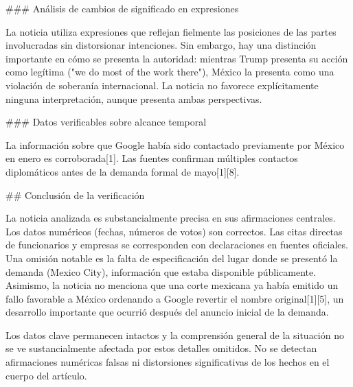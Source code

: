 \documentclass[10pt,a4paper]{article}
\begin{document}
\par\medskip
\#\#\# An\'{a}lisis de cambios de significado en expresiones
\par\medskip
La noticia utiliza expresiones que reflejan fielmente las posiciones de las partes involucradas sin distorsionar intenciones. Sin embargo, hay una distinci\'{o}n importante en c\'{o}mo se presenta la autoridad: mientras Trump presenta su acci\'{o}n como leg\'{i}tima ("we do most of the work there"), M\'{e}xico la presenta como una violaci\'{o}n de soberan\'{i}a internacional. La noticia no favorece expl\'{i}citamente ninguna interpretaci\'{o}n, aunque presenta ambas perspectivas.
\par\medskip
\#\#\# Datos verificables sobre alcance temporal
\par\medskip
La informaci\'{o}n sobre que Google hab\'{i}a sido contactado previamente por M\'{e}xico en enero es corroborada[1]. Las fuentes confirman m\'{u}ltiples contactos diplom\'{a}ticos antes de la demanda formal de mayo[1][8].
\par\medskip
\#\# Conclusi\'{o}n de la verificaci\'{o}n
\par\medskip
La noticia analizada es substancialmente precisa en sus afirmaciones centrales. Los datos num\'{e}ricos (fechas, n\'{u}meros de votos) son correctos. Las citas directas de funcionarios y empresas se corresponden con declaraciones en fuentes oficiales. Una omisi\'{o}n notable es la falta de especificaci\'{o}n del lugar donde se present\'{o} la demanda (Mexico City), informaci\'{o}n que estaba disponible p\'{u}blicamente. Asimismo, la noticia no menciona que una corte mexicana ya hab\'{i}a emitido un fallo favorable a M\'{e}xico ordenando a Google revertir el nombre original[1][5], un desarrollo importante que ocurri\'{o} despu\'{e}s del anuncio inicial de la demanda.
\par\medskip
Los datos clave permanecen intactos y la comprensi\'{o}n general de la situaci\'{o}n no se ve sustancialmente afectada por estos detalles omitidos. No se detectan afirmaciones num\'{e}ricas falsas ni distorsiones significativas de los hechos en el cuerpo del art\'{i}culo.
\vspace{1em}

\end{document}
